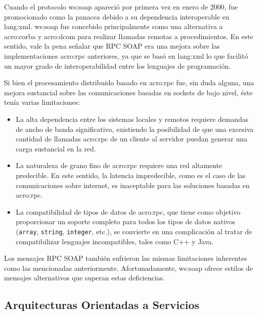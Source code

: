 Cuando el protocolo \gls{ws:soap} apareció por primera vez en enero de 2000, fue promocionado como la panacea debido a su dependencia interoperable en \gls{lang:xml}. \gls{ws:soap} fue concebido principalmente como una alternativa a \gls{acro:corba} y \gls{acro:dcom} para realizar llamadas remotas a procedimientos. En este sentido, vale la pena señalar que RPC SOAP era una mejora sobre las implementaciones \gls{acro:rpc} anteriores, ya que se basó en \gls{lang:xml} lo que facilitó un mayor grado de interoperabilidad entre los lenguajes de programación.

Si bien el procesamiento distribuido basado en \gls{acro:rpc} fue, sin duda alguna, una mejora sustancial sobre las comunicaciones basadas en sockets de bajo nivel, éste tenía varias limitaciones\cite[p.~6]{opensourcesoa:davis}:

\begin{itemize}
  \item La alta dependencia entre los sistemas locales y remotos requiere demandas de ancho de banda significativo, existiendo la posibilidad de que una excesiva cantidad de llamadas \gls{acro:rpc} de un cliente al servidor puedan generar una carga sustancial en la red.
  \item La naturaleza de grano fino de \gls{acro:rpc} requiere una red altamente predecible. En este sentido, la latencia impredecible, como es el caso de las comunicaciones sobre internet, es inaceptable para las soluciones basadas en \gls{acro:rpc}.
  \item La compatibilidad de tipos de datos de \gls{acro:rpc}, que tiene como objetivo proporcionar un soporte completo para todos los tipos de datos nativos (\texttt{array}, \texttt{string}, \texttt{integer}, etc.), se convierte en una complicación al tratar de compatibilizar lenguajes incompatibles, tales como C++ y Java.
\end{itemize}

Los mensajes RPC SOAP también sufrieron las mismas limitaciones inherentes como las mencionadas anteriormente. Afortunadamente, \gls{ws:soap} ofrece estilos de mensajes alternativos que superan estas deficiencias.


\subsection{Arquitecturas Orientadas a Servicios}
\label{soa:definicion}

